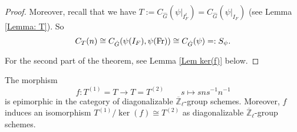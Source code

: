 \begin{proof}

    Moreover, recall that we have $T:=C_{\hat{G}}(\psi|_{I_F^{\ell}})=C_{\hat{G}}(\psi|_{I_F})$ (see Lemma \ref{Lemma: T}). So 
    $$C_T(n) \cong C_{\hat{G}}(\psi(I_F), \psi(\operatorname{Fr})) \cong C_{\hat{G}}(\psi) =: S_{\psi}.$$

    For the second part of the theorem, see Lemma \ref{Lem ker(f)} below.
	
\end{proof}



\begin{lemma}\label{Lem epic}
	The morphism 
	$$f: T^{(1)} = T \longrightarrow T = T^{(2)} \qquad s \longmapsto sns^{-1}n^{-1}$$
	is epimorphic in the category of diagonalizable $\overline{\mathbb{Z}}_{\ell}$-group schemes. Moreover, $f$ induces an isomorphism $T^{(1)}/\ker(f) \cong T^{(2)}$ as diagonalizable $\overline{\mathbb{Z}}_{\ell}$-group schemes.
\end{lemma}

